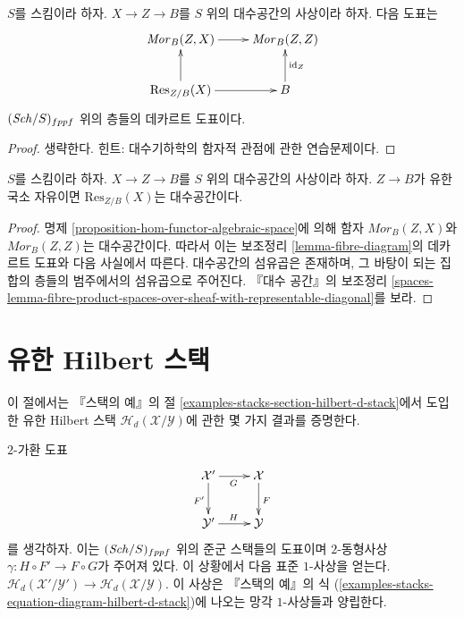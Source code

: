 \begin{lemma}
\label{lemma-fibre-diagram}
$S$를 스킴이라 하자. $X \to Z \to B$를 $S$ 위의
대수공간의 사상이라 하자. 다음 도표는
$$
\xymatrix{
\mathit{Mor}_B(Z, X) \ar[r] & \mathit{Mor}_B(Z, Z) \\
\text{Res}_{Z/B}(X) \ar[r] \ar[u] & B \ar[u]_{\text{id}_Z}
}
$$
$(\mathit{Sch}/S)_{fppf}$ 위의 층들의 데카르트 도표이다.
\end{lemma}

\begin{proof}
생략한다. 힌트: 대수기하학의 함자적 관점에 관한 연습문제이다.
\end{proof}

\begin{proposition}
\label{proposition-restriction-of-scalars-algebraic-space}
$S$를 스킴이라 하자. $X \to Z \to B$를 $S$ 위의
대수공간의 사상이라 하자. $Z \to B$가 유한 국소 자유이면
$\text{Res}_{Z/B}(X)$는 대수공간이다.
\end{proposition}

\begin{proof}
명제 \ref{proposition-hom-functor-algebraic-space}에 의해 함자
$\mathit{Mor}_B(Z, X)$와 $\mathit{Mor}_B(Z, Z)$는 대수공간이다.
따라서 이는 보조정리 \ref{lemma-fibre-diagram}의 데카르트 도표와
다음 사실에서 따른다. 대수공간의 섬유곱은 존재하며, 그 바탕이 되는
집합의 층들의 범주에서의 섬유곱으로 주어진다. 『대수 공간』의 보조정리
\ref{spaces-lemma-fibre-product-spaces-over-sheaf-with-representable-diagonal}를
보라.
\end{proof}






\section{유한 Hilbert 스택}
\label{section-finite-hilbert-stacks}

\noindent
이 절에서는 『스택의 예』의 절
\ref{examples-stacks-section-hilbert-d-stack}에서 도입한 유한
Hilbert 스택 $\mathcal{H}_d(\mathcal{X}/\mathcal{Y})$에 관한
몇 가지 결과를 증명한다.

\begin{lemma}
\label{lemma-map-hilbert}
$2$-가환 도표
$$
\xymatrix{
\mathcal{X}' \ar[r]_G \ar[d]_{F'} & \mathcal{X} \ar[d]^F \\
\mathcal{Y}' \ar[r]^H & \mathcal{Y}
}
$$
를 생각하자. 이는 $(\mathit{Sch}/S)_{fppf}$ 위의 준군 스택들의 도표이며
$2$-동형사상 $\gamma : H \circ F' \to F \circ G$가 주어져 있다.
이 상황에서 다음 표준 $1$-사상을 얻는다.
$\mathcal{H}_d(\mathcal{X}'/\mathcal{Y}') \to
\mathcal{H}_d(\mathcal{X}/\mathcal{Y})$.
이 사상은 『스택의 예』의 식
(\ref{examples-stacks-equation-diagram-hilbert-d-stack})에 나오는
망각 $1$-사상들과 양립한다.
\end{lemma}

